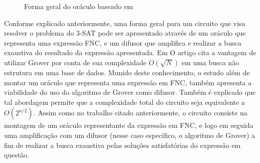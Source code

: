 \documentclass[12pt]{article}
\begin{document}
\begin{figure}[ht]
\centering
{}
\caption{Forma geral do oráculo baseado em \cite{parallelAndDistributed}}
\label{fig:oraculo_forma_geral2}
\end{figure}

Conforme explicado anteriormente, uma forma geral para um circuito que visa resolver o problema do 3-SAT pode ser apresentado através de um oráculo que representa uma expressão FNC, e um difusor que amplifica e realizar a busca exaustiva do resultado da expressão apresentada. Em \textbf{\cite{wang:20}} O artigo cita a vantagem de utilizar Grover por conta de sua complexidade $O \left( \sqrt{N} \right)$ em uma busca não estrutura em uma base de dados. Munido deste conhecimento, o estudo além de montar um oráculo que representa uma expressão em FNC, também apresenta a viabilidade do uso do algoritmo de Grover como difusor. Também é explicado que tal abordagem permite que a complexidade total do circuito seja equivalente a $O(2^{n/2})$. Assim como no trabalho citado anteriormente, o circuito consiste na montagem de um oráculo representante da expressão em FNC, e logo em seguida uma amplificação com um difusor (nesse caso específico, o algoritmo de Grover) a fim de realizar a busca exaustiva pelas soluções satisfatórias do expressão em questão.
\end{document}
